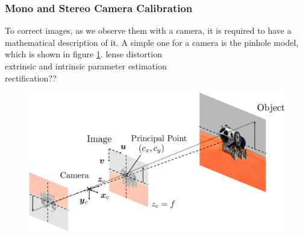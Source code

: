 \subsubsection{Mono and Stereo Camera Calibration}
To correct images, as we observe them with a camera, it is required to have a mathematical description of it. A simple one for a camera is the pinhole model, which is shown in figure \ref{fig::323_point_hole_camera}.  
\cite{duane1971close} lense distortion\\
\cite{zhang2000flexible} extrinsic and intrinsic parameter estimation \\
\cite{loop1999computing} rectification??\\
\begin{figure}[h]
	\centering
	\includegraphics[scale=.28]{chapters/03_background/img/point_hole_camera.png}
	\caption{}
	\label{fig::323_point_hole_camera}
\end{figure}
